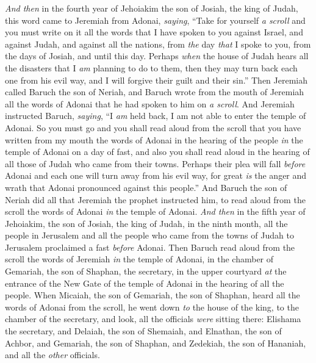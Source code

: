 \begin{biblechapter} %
 \textit{And then} in the fourth year of Jehoiakim the son of Josiah, the king of Judah, this word came to Jeremiah from Adonai, \textit{saying},
\verse “Take for yourself \textit{a scroll} and you must write on it all the words that I have spoken to you against Israel, and against Judah, and against all the nations, from \textit{the} day \textit{that} I spoke to you, from the days of Josiah, and until this day.
\verse Perhaps \textit{when} the house of Judah hears all the disasters that I \textit{am} planning to do to them, then they may turn back each one from his evil way, and I will forgive their guilt and their sin.”
\verse Then Jeremiah called Baruch the son of Neriah, and Baruch wrote from the mouth of Jeremiah all the words of Adonai that he had spoken to him on \textit{a scroll}.
\verse And Jeremiah instructed Baruch, \textit{saying}, “I \textit{am} held back, I am not able to enter the temple of Adonai.
\verse So you must go and you shall read aloud from the scroll that you have written from my mouth the words of Adonai in the hearing of the people \textit{in} the temple of Adonai on a day of fast, and also you shall read aloud in the hearing of all those of Judah who came from their towns.
\verse Perhaps their plea will fall \textit{before} Adonai and each one will turn away from his evil way, for great \textit{is} the anger and wrath that Adonai pronounced against this people.”
\verse And Baruch the son of Neriah did all that Jeremiah the prophet instructed him, to read aloud from the scroll the words of Adonai \textit{in} the temple of Adonai.
\verse \textit{And then} in the fifth year of Jehoiakim, the son of Josiah, the king of Judah, in the ninth month, all the people in Jerusalem and all the people who came from the towns of Judah to Jerusalem proclaimed a fast \textit{before} Adonai.
\verse Then Baruch read aloud from the scroll the words of Jeremiah \textit{in} the temple of Adonai, in the chamber of Gemariah, the son of Shaphan, the secretary, in the upper courtyard \textit{at} the entrance of the New Gate of the temple of Adonai in the hearing of all the people.
\verse When Micaiah, the son of Gemariah, the son of Shaphan, heard all the words of Adonai from the scroll,
\verse he went down \textit{to} the house of the king, to the chamber of the secretary, and look, all the officials \textit{were} sitting there: Elishama the secretary, and Delaiah, the son of Shemaiah, and Elnathan, the son of Achbor, and Gemariah, the son of Shaphan, and Zedekiah, the son of Hananiah, and all the \textit{other} officials.

\end{biblechapter}
